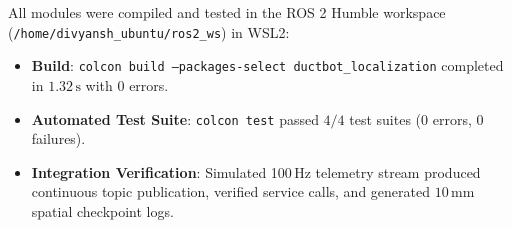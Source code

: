 \documentclass[11pt,a4paper]{article}
\begin{document}
All modules were compiled and tested in the ROS 2 Humble workspace (\texttt{/home/divyansh\_ubuntu/ros2\_ws}) in WSL2:
\begin{itemize}
    \item \textbf{Build}: \texttt{colcon build --packages-select ductbot\_localization} completed in $1.32\,\text{s}$ with $0$ errors.
    \item \textbf{Automated Test Suite}: \texttt{colcon test} passed $4/4$ test suites ($0$ errors, $0$ failures).
    \item \textbf{Integration Verification}: Simulated 100\,Hz telemetry stream produced continuous topic publication, verified service calls, and generated $10\,\text{mm}$ spatial checkpoint logs.
\end{itemize}
\end{document}
